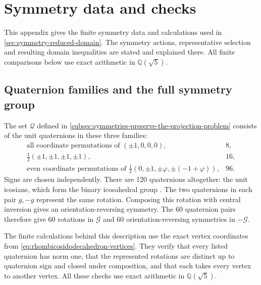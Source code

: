 \section{Symmetry data and checks}\label{app:symmetry-data-and-checks}

This appendix gives the finite symmetry data and calculations used in
\cref{sec:symmetry-reduced-domain}. The symmetry actions, representative
selection and resulting domain inequalities are stated and explained there.
All finite comparisons below use exact arithmetic in $\mathbb Q(\sqrt5)$.

\subsection{Quaternion families and the full symmetry group}\label{app:quaternion-families-and-the-full-symmetry-group}

The set $\mathcal Q$ defined in
\cref{subsec:symmetries-preserve-the-projection-problem} consists of the
unit quaternions in these three families:
\[
\begin{array}{lr}
  \text{all coordinate permutations of }(\pm1,0,0,0), & 8,\\[2pt]
  \frac12(\pm1,\pm1,\pm1,\pm1), & 16,\\[2pt]
  \text{even coordinate permutations of }
    \frac12(0,\pm1,\pm\varphi,\pm(-1+\varphi)), & 96.
\end{array}
\]
Signs are chosen independently. There are 120 quaternions altogether: the
unit icosians, which form the binary icosahedral group
\citep{ConwaySmith2003}.
The two quaternions in each pair $g,-g$ represent the same rotation.
Composing this rotation with central inversion gives an orientation-reversing
symmetry. The 60 quaternion pairs therefore give 60 rotations in $\mathcal G$
and 60 orientation-reversing symmetries in $-\mathcal G$.

The finite calculations behind this description use the exact vertex
coordinates from \cref{eq:rhombicosidodecahedron-vertices}. They verify
that every listed quaternion has norm one, that the represented rotations
are distinct up to quaternion sign and closed under composition, and
that each takes every vertex to another vertex. All these checks use exact
arithmetic in $\mathbb Q(\sqrt5)$.

